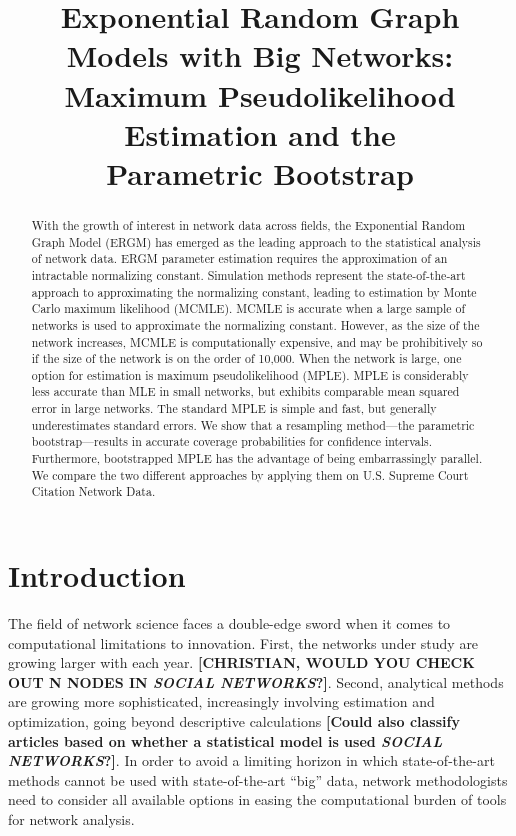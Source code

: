 \documentclass[headsepline=true, abstracton]{scrartcl}
\begin{document}
\setcounter{section}{-1}

\renewcommand{\refname}{Bibliography}


\onehalfspacing
\setlength{\headsep}{15mm}


\thispagestyle{plain}

\title{\Large Exponential Random Graph Models with Big Networks: Maximum Pseudolikelihood Estimation and the\\Parametric Bootstrap}
\maketitle

\begin{abstract}
\noindent With the growth of interest in network data across fields, the Exponential Random Graph Model (ERGM) has emerged as the leading approach to the statistical analysis of network data. ERGM parameter estimation requires the approximation of an intractable normalizing constant. Simulation methods represent the state-of-the-art approach to approximating the normalizing constant, leading to estimation by Monte Carlo maximum likelihood (MCMLE). MCMLE is accurate when a large sample of networks is used to approximate the normalizing constant. However, as the size of the network increases, MCMLE is computationally expensive, and may be prohibitively so if the size of the network is on the order of 10,000. When the network is large, one option for estimation is maximum pseudolikelihood (MPLE). MPLE is considerably less accurate than MLE in small networks, but exhibits comparable mean squared error in large networks. The standard MPLE is simple and fast, but generally underestimates standard errors. We show that a resampling method---the parametric bootstrap---results in accurate coverage probabilities for confidence intervals. Furthermore, bootstrapped MPLE has the advantage of being embarrassingly parallel. We compare the two different approaches by applying them on U.S. Supreme Court Citation Network Data.
\end{abstract}


 \section*{Introduction}
 
The field of network science faces a double-edge sword when it comes to computational limitations to innovation. First, the networks under study are growing larger with each year. {\bf [CHRISTIAN, WOULD YOU CHECK OUT N NODES IN {\em SOCIAL NETWORKS}?]}. Second, analytical methods are growing more sophisticated, increasingly involving estimation and optimization, going beyond descriptive calculations {\bf [Could also classify articles based on whether a statistical model is used {\em SOCIAL NETWORKS}?]}. In order to avoid a limiting horizon in which state-of-the-art methods cannot be used with state-of-the-art ``big'' data, network methodologists need to consider all available options in easing the computational burden of tools for network analysis.
 
\end{document}
